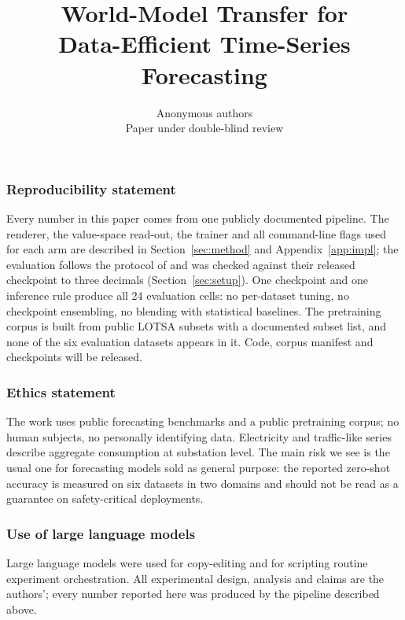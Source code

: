 \documentclass{article} %
\title{World-Model Transfer for\\ Data-Efficient Time-Series Forecasting}
\author{Anonymous authors\\
Paper under double-blind review}
\begin{document}
\maketitle









\subsubsection*{Reproducibility statement}

Every number in this paper comes from one publicly documented pipeline. The renderer, the
value-space read-out, the trainer and all command-line flags used for each arm are described in
Section~\ref{sec:method} and Appendix~\ref{app:impl}; the evaluation follows the protocol of
\citet{visionts} and was checked against their released checkpoint to three decimals
(Section~\ref{sec:setup}). One checkpoint and one inference rule produce all 24 evaluation cells:
no per-dataset tuning, no checkpoint ensembling, no blending with statistical baselines. The
pretraining corpus is built from public LOTSA subsets \citep{moirai} with a documented subset list,
and none of the six evaluation datasets appears in it. Code, corpus manifest and checkpoints will be
released.

\subsubsection*{Ethics statement}

The work uses public forecasting benchmarks and a public pretraining corpus; no human subjects, no
personally identifying data. Electricity and traffic-like series describe aggregate consumption at
substation level. The main risk we see is the usual one for forecasting models sold as general
purpose: the reported zero-shot accuracy is measured on six datasets in two domains and should not
be read as a guarantee on safety-critical deployments.

\subsubsection*{Use of large language models}

Large language models were used for copy-editing and for scripting routine experiment
orchestration. All experimental design, analysis and claims are the authors'; every number reported
here was produced by the pipeline described above.




\appendix

\end{document}

